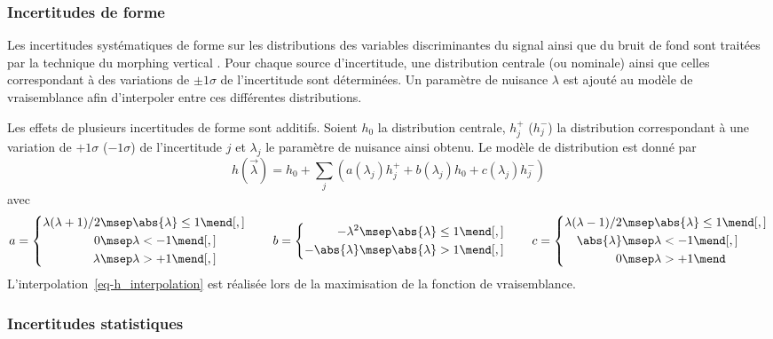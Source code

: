 \subsubsection{Incertitudes de forme}
Les incertitudes systématiques de forme sur les distributions des variables discriminantes du signal ainsi que du bruit de fond sont traitées par la technique du \og morphing vertical \fg.
Pour chaque source d'incertitude, une distribution centrale (ou nominale) ainsi que celles correspondant à des variations de $\pm1\sigma$ de l'incertitude sont déterminées.
Un paramètre de nuisance $\lambda$ est ajouté au modèle de vraisemblance afin d'interpoler entre ces différentes distributions.
\par
Les effets de plusieurs incertitudes de forme sont additifs.
Soient
$h_0$ la distribution centrale,
$h_j^+$ ($h_j^-$) la distribution correspondant à une variation de $+1\sigma$ ($-1\sigma$) de l'incertitude $j$ et
$\lambda_j$ le paramètre de nuisance ainsi obtenu.
Le modèle de distribution est donné par
\begin{equation}
h(\vec{\lambda}) = h_0 + \sum_j \left( a(\lambda_j)h_j^+ + b(\lambda_j) h_0 + c(\lambda_j)h_j^- \right)
\label{eq-h_interpolation}
\end{equation}
avec
\begin{equation}
a = \left\lbrace
\begin{aligned}
\lambda(\lambda+1)/2 &\msep \abs{\lambda}\leq1 \mend[,] \\
0 &\msep \lambda<-1 \mend[,] \\
\lambda &\msep \lambda>+1 \mend[,]
\end{aligned}
\right.
\qquad
b = \left\lbrace
\begin{aligned}
-\lambda^2 &\msep \abs{\lambda}\leq1 \mend[,] \\
-\abs{\lambda} &\msep \abs{\lambda}>1 \mend[,]
\end{aligned}
\right.
\qquad
c = \left\lbrace
\begin{aligned}
\lambda(\lambda-1)/2 &\msep \abs{\lambda}\leq1 \mend[,] \\
\abs{\lambda} &\msep \lambda<-1 \mend[,] \\
0 &\msep \lambda>+1 \mend
\end{aligned}
\right.
\end{equation}
L'interpolation~\eqref{eq-h_interpolation} est réalisée lors de la maximisation de la fonction de vraisemblance.
\subsubsection{Incertitudes statistiques}\label{chapter-HTT_analysis-section-signal_extraction-likelihood-stat_uncs}
